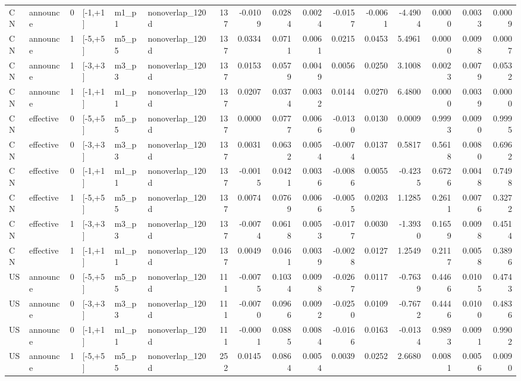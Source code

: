 \begin{tabular}{llrlllrrrrrrrrrr}
CN & announce & 0 & [-1,+1] & m1_p1 & nonoverlap_120d & 137 & -0.0109 & 0.0284 & 0.0024 & -0.0157 & -0.0061 & -4.4904 & 0.0000 & 0.0033 & 0.0009 \\
CN & announce & 1 & [-5,+5] & m5_p5 & nonoverlap_120d & 137 & 0.0334 & 0.0711 & 0.0061 & 0.0215 & 0.0453 & 5.4961 & 0.0000 & 0.0098 & 0.0007 \\
CN & announce & 1 & [-3,+3] & m3_p3 & nonoverlap_120d & 137 & 0.0153 & 0.0579 & 0.0049 & 0.0056 & 0.0250 & 3.1008 & 0.0023 & 0.0079 & 0.0532 \\
CN & announce & 1 & [-1,+1] & m1_p1 & nonoverlap_120d & 137 & 0.0207 & 0.0374 & 0.0032 & 0.0144 & 0.0270 & 6.4800 & 0.0000 & 0.0039 & 0.0000 \\
CN & effective & 0 & [-5,+5] & m5_p5 & nonoverlap_120d & 137 & 0.0000 & 0.0777 & 0.0066 & -0.0130 & 0.0130 & 0.0009 & 0.9993 & 0.0090 & 0.9995 \\
CN & effective & 0 & [-3,+3] & m3_p3 & nonoverlap_120d & 137 & 0.0031 & 0.0632 & 0.0054 & -0.0074 & 0.0137 & 0.5817 & 0.5618 & 0.0080 & 0.6962 \\
CN & effective & 0 & [-1,+1] & m1_p1 & nonoverlap_120d & 137 & -0.0015 & 0.0421 & 0.0036 & -0.0086 & 0.0055 & -0.4235 & 0.6726 & 0.0048 & 0.7498 \\
CN & effective & 1 & [-5,+5] & m5_p5 & nonoverlap_120d & 137 & 0.0074 & 0.0769 & 0.0066 & -0.0055 & 0.0203 & 1.1285 & 0.2611 & 0.0076 & 0.3272 \\
CN & effective & 1 & [-3,+3] & m3_p3 & nonoverlap_120d & 137 & -0.0074 & 0.0618 & 0.0053 & -0.0177 & 0.0030 & -1.3930 & 0.1659 & 0.0098 & 0.4514 \\
CN & effective & 1 & [-1,+1] & m1_p1 & nonoverlap_120d & 137 & 0.0049 & 0.0461 & 0.0039 & -0.0028 & 0.0127 & 1.2549 & 0.2117 & 0.0058 & 0.3896 \\
US & announce & 0 & [-5,+5] & m5_p5 & nonoverlap_120d & 111 & -0.0075 & 0.1034 & 0.0098 & -0.0267 & 0.0117 & -0.7639 & 0.4466 & 0.0105 & 0.4743 \\
US & announce & 0 & [-3,+3] & m3_p3 & nonoverlap_120d & 111 & -0.0070 & 0.0966 & 0.0092 & -0.0250 & 0.0109 & -0.7672 & 0.4446 & 0.0100 & 0.4836 \\
US & announce & 0 & [-1,+1] & m1_p1 & nonoverlap_120d & 111 & -0.0001 & 0.0885 & 0.0084 & -0.0166 & 0.0163 & -0.0134 & 0.9893 & 0.0091 & 0.9902 \\
US & announce & 1 & [-5,+5] & m5_p5 & nonoverlap_120d & 252 & 0.0145 & 0.0864 & 0.0054 & 0.0039 & 0.0252 & 2.6680 & 0.0081 & 0.0056 & 0.0090 \\

\end{tabular}
